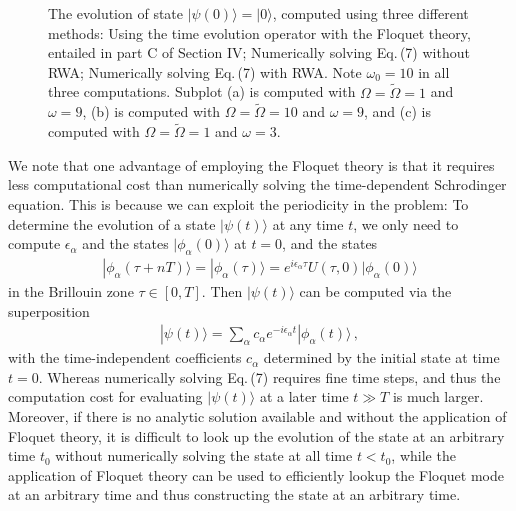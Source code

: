 \documentclass[reprint, amsmath, amssymb, aps]{revtex4-2}
\newcommand{\that}[1]{\widetilde{#1}}
\begin{document}
\begin{figure}
\caption{The evolution of state $|\psi(0)\rangle = |0\rangle$, computed using three different methods: Using the time evolution operator with the Floquet theory, entailed in part C of Section IV; Numerically solving Eq.\,(7) without RWA; Numerically solving Eq.\,(7) with RWA. Note $\omega_0 = 10$ in all three computations. Subplot (a) is computed with $\Omega =\that{\Omega} = 1$ and $\omega = 9$, (b) is computed with $\Omega =\that{\Omega} = 10$ and $\omega = 9$, and (c) is computed with $\Omega = \that{\Omega }=1$ and $\omega = 3$.}
\end{figure}

We note that one advantage of employing the Floquet theory is that it requires less computational cost than numerically solving the time-dependent Schrodinger equation. This is because we can exploit the periodicity in the problem: To determine the evolution of a state $|\psi(t)\rangle$
at any time $t$,
we only need to compute $\epsilon_\alpha$ and the states $|\phi_\alpha(0)\rangle$ at $t = 0$, and the states
\begin{align}
|\phi_\alpha(\tau+nT)\rangle=|\phi_\alpha(\tau)\rangle = e^{i\epsilon_\alpha \tau} U(\tau,0) |\phi_\alpha(0)\rangle 
\end{align}
in the Brillouin zone $\tau \in [0,T]$. Then $|\psi(t)\rangle$ can be computed via the superposition
\begin{align}
|\psi(t)\rangle = \sum_\alpha c_\alpha e^{-i\epsilon_\alpha t}|\phi_\alpha(t)\rangle\,,
\end{align}
with the time-independent coefficients $c_\alpha$ determined by the initial state at time $t = 0$. Whereas numerically solving Eq.\,(7) requires fine time steps, and thus the computation cost for evaluating $|\psi(t)\rangle$ at a later time $t\gg T$ is much larger. Moreover, if there is no analytic solution available and without the application of Floquet theory, it is difficult to look up the evolution of the state at an arbitrary time $t_0$ without numerically solving the state at all time $t<t_0$, while the application of Floquet theory can be used to efficiently lookup the Floquet mode at an arbitrary time and thus constructing the state at an arbitrary time. \\
\end{document}
